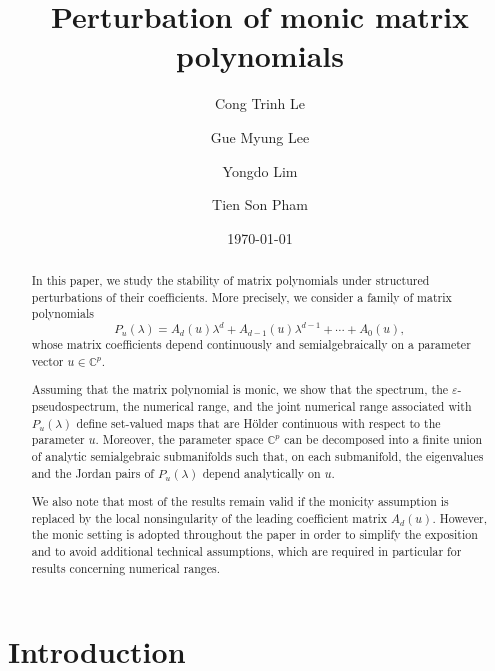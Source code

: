 \documentclass[10pt,reqno]{amsart}
\theoremstyle{break-italic}
\theoremstyle{break-italic}
\theoremstyle{break-italic}
\theoremstyle{break-italic}
\theoremstyle{break-italic}
\theoremstyle{break-italic}
\theoremstyle{break-italic}
\theoremstyle{break-italic}
\theoremstyle{break-roman}
\theoremstyle{standard}
\theoremstyle{varthm-roman}
\theoremstyle{varthm-italic}
\theoremstyle{varthm-roman-break}
\theoremstyle{varthm-italic-break}
\theoremstyle{varthm-roman-no-punctuation}
\theoremstyle{varthm-italic-no-punctuation}
\numberwithin{equation}{section}
\begin{document}
\title[Perturbation of monic matrix polynomials]{Perturbation of monic matrix polynomials}
\author{Cong Trinh Le} 
\address{Department of Mathematics and Statistics, Quy Nhon University, Quy Nhon Nam Ward, Vietnam}
\author{Gue Myung Lee}
\address{Department of Applied Mathematics, Pukyong National University, Busan 48513, Korea}
\author{Yongdo Lim}
\address{Department of Mathematics, Sungkyunkwan University, Suwon 440--746, Korea}
\author{Tien Son Pham}
\address{Department of Mathematics, University of Dalat, 1 Phu Dong Thien Vuong, Dalat, Vietnam}
\date{\today}
\begin{abstract}
In this paper, we study the stability of matrix polynomials under structured
perturbations of their coefficients. More precisely, we consider a family of
matrix polynomials
\[
P_u(\lambda)=A_d(u)\lambda^d+A_{d-1}(u)\lambda^{d-1}+\cdots+A_0(u),
\]
whose matrix coefficients depend continuously and semialgebraically on a
parameter vector $u\in\mathbb{C}^p$.

Assuming that the matrix polynomial is monic, we show that the spectrum, the
$\varepsilon$-pseudospectrum, the numerical range, and the joint numerical
range associated with $P_u(\lambda)$ define set-valued maps that are
H\"older continuous with respect to the parameter $u$. Moreover, the
parameter space $\mathbb{C}^p$ can be decomposed into a finite union of
analytic semialgebraic submanifolds such that, on each submanifold, the
eigenvalues and the Jordan pairs of $P_u(\lambda)$ depend analytically on $u$.

We also note that most of the results remain valid if the monicity assumption
is replaced by the local nonsingularity of the leading coefficient matrix
$A_d(u)$. However, the monic setting is adopted throughout the paper in order
to simplify the exposition and to avoid additional technical assumptions,
which are required in particular for results concerning numerical ranges.
\end{abstract}

\maketitle
\section{Introduction}
\end{document}
